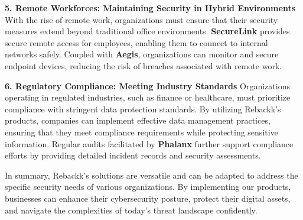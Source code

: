 \textbf{5. Remote Workforces: Maintaining Security in Hybrid Environments}  
With the rise of remote work, organizations must ensure that their security measures extend beyond traditional office environments. \textbf{SecureLink} provides secure remote access for employees, enabling them to connect to internal networks safely. Coupled with \textbf{Aegis}, organizations can monitor and secure endpoint devices, reducing the risk of breaches associated with remote work.

\textbf{6. Regulatory Compliance: Meeting Industry Standards}  
Organizations operating in regulated industries, such as finance or healthcare, must prioritize compliance with stringent data protection standards. By utilizing Rebackk's products, companies can implement effective data management practices, ensuring that they meet compliance requirements while protecting sensitive information. Regular audits facilitated by \textbf{Phalanx} further support compliance efforts by providing detailed incident records and security assessments.

In summary, Rebackk’s solutions are versatile and can be adapted to address the specific security needs of various organizations. By implementing our products, businesses can enhance their cybersecurity posture, protect their digital assets, and navigate the complexities of today’s threat landscape confidently.